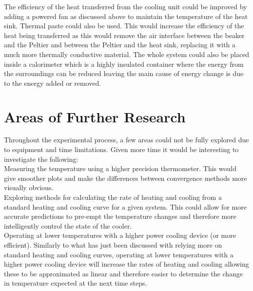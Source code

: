 \documentclass[10pt]{article}
\begin{document}
The efficiency of the heat transferred from the cooling unit could be improved by adding a powered fan as discussed above to maintain the temperature of the heat sink. Thermal paste\cite{paste} could also be used. This would increase the efficiency of the heat being transferred as this would remove the air interface between the beaker and the Peltier and between the Peltier and the heat sink, replacing it with a much more thermally conductive material. The whole system could also be placed inside a calorimeter\cite{calorimeter} which is a highly insulated container where the energy from the surroundings can be reduced leaving the main cause of energy change is due to the energy added or removed.\\

\section*{Areas of Further Research}
Throughout the experimental process, a few areas could not be fully explored due to equipment and time limitations. Given more time it would be interesting to investigate the following: \\

Measuring the temperature using a higher precision thermometer. This would give smoother plots and make the differences between convergence methods more visually obvious.\\

Exploring methods for calculating the rate of heating and cooling from a standard heating and cooling curve for a given system. This could allow for more accurate predictions to pre-empt the temperature changes and therefore more intelligently control the state of the cooler. \\

Operating at lower temperatures with a higher power cooling device (or more efficient). Similarly to what has just been discussed with relying more on standard heating and cooling curves, operating at lower temperatures with a higher power cooling device will increase the rates of heating and cooling allowing these to be approximated as linear and therefore easier to determine the change in temperature expected at the next time steps.\\

\end{document}
